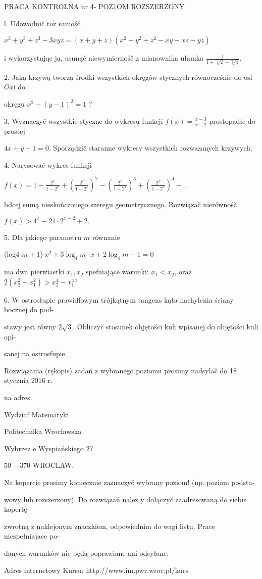 \documentclass[a4paper,12pt]{article}
\begin{document}
PRACA KONTROLNA nr 4- POZ1OM ROZSZERZONY

l. Udowodnič $\mathrm{t}\mathrm{o}\dot{\mathrm{z}}$ samośč

$x^{3}+y^{3}+z^{3}-3xyz=(x+y+z)(x^{2}+y^{2}+z^{2}-xy-xz-yz)$

$\mathrm{i}$ wykorzystujqc ją, usunąč niewymiernośč $\mathrm{z}$ mianownika ułamka $\displaystyle \frac{1}{1+\sqrt[3]{2}+\sqrt[3]{4}}.$

2. Jaką krzywą tworzą środki wszystkich okręgów stycznych równocześnie do osi $Ox\mathrm{i}$ do

okręgu $x^{2}+(y-1)^{2}=1$ ?

3. Wyznaczyč wszystkie styczne do wykresu funkcji $f(x)=\displaystyle \frac{x-3}{x-2}$ prostopadłe do prostej

$4x+y+1=0$. Sporządzič staranne wykresy wszystkich rozwazanych krzywych.

4. Narysowač wykres funkcji

$ f(x)=1-\displaystyle \frac{2^{x}}{1-2^{x}}+(\frac{2^{x}}{1-2^{x}})^{2}-(\frac{2^{x}}{1-2^{x}})^{3}+(\frac{2^{x}}{1-2^{x}})^{4}-\ldots$

bdcej sumą nieskończonego szeregu geometrycznego. Rozwiązač nierównośč

$f(x)>4^{x}-21\cdot 2^{x-2}+2.$

5. Dla jakiego parametru $m$ równanie

(log4 $m+1$)$\cdot x^{2}+3\log_{4}m\cdot x+2\log_{4}m-1=0$

ma dwa pierwiastki $x_{1}, x_{2}$ spefniające warunki: $x_{1}<x_{2}$, oraz $2(x_{2}^{2}-x_{1}^{2})>x_{2}^{4}-x_{1}^{4}$?

6. $\mathrm{W}$ ostrosłupie prawidfowym trójkątnym tangens kąta nachylenia ściany bocznej do pod-

stawy jest równy $2\sqrt{3}$. Obliczyč stosunek objętości kuli wpisanej do objętości kuli opi-

sanej na ostrosfupie.

Rozwiązania (rękopis) zadań z wybranego poziomu prosimy nadsylač do 18 stycznia 2016 r.

na adres:

Wydziaf Matematyki

Politechnika Wrocfawska

Wybrzez $\mathrm{e}$ Wyspiańskiego 27

$50-370$ WROCLAW.

Na kopercie prosimy $\underline{\mathrm{k}\mathrm{o}\mathrm{n}\mathrm{i}\mathrm{e}\mathrm{c}\mathrm{z}\mathrm{n}\mathrm{i}\mathrm{e}}$ zaznaczyč wybrany poziom! (np. poziom podsta-

wowy lub rozszerzony). Do rozwiązań nalez $\mathrm{y}$ dołączyč zaadresowaną do siebie kopertę

zwrotną $\mathrm{z}$ naklejonym znaczkiem, odpowiednim do wagi listu. Prace niespełniajace po-

danych warunków nie będą poprawiane ani odsyłane.

Adres internetowy Kursu: http://www.im.pwr.wroc.pl/kurs
\end{document}
